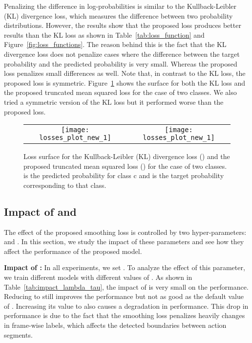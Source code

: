 \documentclass[10pt,twocolumn,letterpaper]{article}
\begin{document}
Penalizing the difference in log-probabilities is similar to the Kullback-Leibler 
(KL) divergence loss, which measures the difference between two probability 
distributions. However, the results show that the proposed loss produces better 
results than the KL loss as shown in Table~\ref{tab:loss_function} 
and Figure~\ref{fig:loss_functions}. The reason behind this is the fact that 
the KL divergence loss does not penalize cases where the difference between the target 
probability and the predicted probability is very small. Whereas the proposed 
loss penalizes small differences as well. Note that, in contrast to the KL loss, 
the proposed loss is symmetric. Figure~\ref{fig:losses_plot} shows the surface 
for both the KL loss and the proposed truncated mean squared loss for the case 
of two classes. We also tried a symmetric version of the KL loss but it performed 
worse than the proposed loss.


\begin{figure}[tb]
\begin{center}
\begin{tabular}{cc}
   \texttt{[image: losses\_plot\_new\_1]} & \texttt{[image: losses\_plot\_new\_1]}
\end{tabular}
\end{center}
   \caption{Loss surface for the Kullback-Leibler (KL) divergence loss () 
   and the proposed truncated mean squared loss () for the case of two 
   classes.  is the predicted probability for class c and  is the target 
   probability corresponding to that class.}
\label{fig:losses_plot}
\end{figure}



\subsection{Impact of  and }

The effect of the proposed smoothing loss is controlled by two hyper-parameters: 
 and . In this section, we study the impact of these parameters and 
see how they affect the performance of the proposed model.

\noindent\textbf{Impact of :} In all experiments, we set . To 
analyze the effect of this parameter, we train different models with different 
values of . As shown in Table~\ref{tab:impact_lambda_tau}, the impact 
of  is very small on the performance. Reducing  to  
still improves the performance but not as good as the default value of . 
Increasing its value to  also causes a degradation in 
performance. This drop in performance is due to the fact that the smoothing loss 
penalizes heavily changes in frame-wise labels, which affects the detected boundaries 
between action segments.
\end{document}
